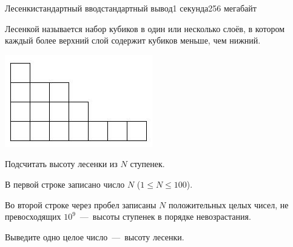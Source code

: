 \begin{problem}{Лесенки}{стандартный ввод}{стандартный вывод}{1 секунда}{256 мегабайт}

Лесенкой называется набор кубиков в один или несколько слоёв, в котором
каждый более верхний слой содержит кубиков меньше, чем нижний.

\includegraphics[scale=1,natwidth=243,natheight=152]{pic.jpg}

Подсчитать высоту лесенки из $N$ ступенек.

\InputFile
В первой строке записано число $N$ ($1 \le N \le 100$).

Во второй строке через пробел записаны $N$ положительных целых чисел, не превосходящих $10^9$~---~высоты ступенек в порядке невозрастания.

\OutputFile
Выведите одно целое число~---~высоту лесенки.

\Example

\begin{example}
%
\end{example}

\end{problem}

